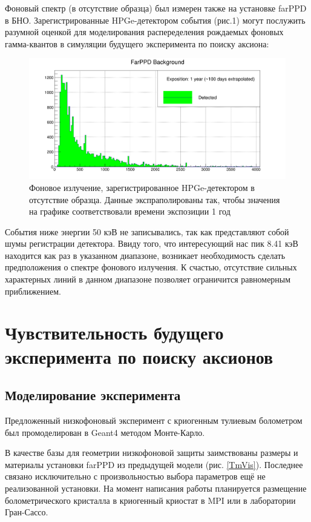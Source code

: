 \documentclass[a4paper,article,14pt]{extarticle}
\begin{document}
    Фоновый спектр (в отсутствие образца) был измерен также на установке farPPD в БНО. Зарегистрированные HPGe-детектором события (рис.1) могут послужить разумной оценкой для моделирования распеределения рождаемых фоновых гамма-квантов в симуляции будущего эксперимента по поиску аксиона:
    
    \begin{figure}[h]
    \centering
    \includegraphics[width = \textwidth]{images/FarPPD_background.png}
    \caption{Фоновое излучение, зарегистрированное HPGe-детектором в отсутствие образца. Данные экспраполированы так, чтобы значения на графике соответствовали времени экспозиции 1 год}
    \label{fon}
\end{figure}
    
    События ниже энергии 50 кэВ не записывались, так как представляют собой шумы регистрации детектора. Ввиду того, что интересующий нас пик 8.41 кэВ находится как раз в указанном диапазоне, возникает необходимость сделать предположения о спектре фонового излучения. К счастью, отсутствие сильных характерных линий в данном диапазоне позволяет ограничится равномерным приближением.
    
\section{Чувствительность будущего эксперимента по поиску аксионов}

\subsection{Моделирование эксперимента}

Предложенный низкофоновый эксперимент с криогенным тулиевым болометром был промоделирован в Geant4 методом Монте-Карло. 

В качестве базы для геометрии низкофоновой защиты заимствованы размеры и материалы установки farPPD из предыдущей модели (рис. \ref{TmVis}). Последнее связано исключительно с произвольностью выбора параметров ещё не реализованной установки. На момент написания работы планируется размещение болометрического кристалла в криогенный криостат в MPI или в лаборатории Гран-Сассо.
\end{document}
